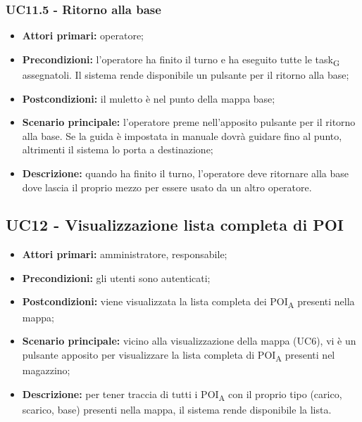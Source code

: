 \subsubsection{UC11.5 - Ritorno alla base}
\begin{itemize}
	\item 	\textbf{Attori primari:} operatore;
	\item 	\textbf{Precondizioni:} l'operatore ha finito il turno e ha eseguito tutte le task\textsubscript{G} assegnatoli. Il sistema rende disponibile un pulsante per il ritorno alla base;
	\item 	\textbf{Postcondizioni:} il muletto è nel punto della mappa base;
	\item 	\textbf{Scenario principale:} l'operatore preme nell'apposito pulsante per il ritorno alla base. Se la guida è impostata in manuale dovrà guidare fino al punto, altrimenti il sistema lo porta a destinazione;
	\item 	\textbf{Descrizione:} quando ha finito il turno, l'operatore deve ritornare alla base dove lascia il proprio mezzo per essere usato da un altro operatore.
\end{itemize}

\subsection{UC12 - Visualizzazione lista completa di POI}
\begin{itemize}
	\item 	\textbf{Attori primari:} amministratore, responsabile;
	\item 	\textbf{Precondizioni:} gli utenti sono autenticati;
	\item 	\textbf{Postcondizioni:} viene visualizzata la lista completa dei POI\textsubscript{A} presenti nella mappa;
	\item 	\textbf{Scenario principale:} vicino alla visualizzazione della mappa (UC6), vi è un pulsante apposito per visualizzare la lista completa di POI\textsubscript{A} presenti nel magazzino;
	\item 	\textbf{Descrizione:} per tener traccia di tutti i POI\textsubscript{A} con il proprio tipo (carico, scarico, base) presenti nella mappa, il sistema rende disponibile la lista.

\end{itemize}

